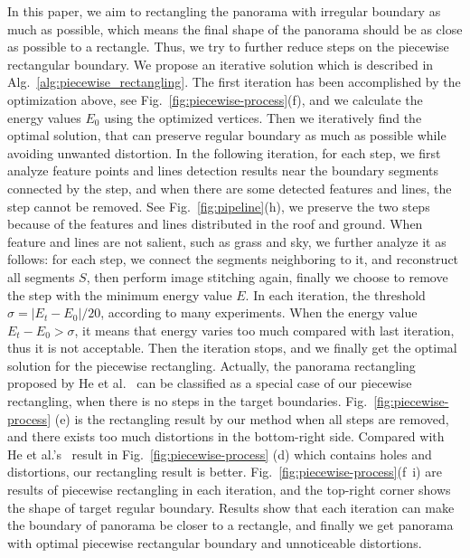 \documentclass[10pt,journal,compsoc]{IEEEtran}
\begin{document}
In this paper, we aim to rectangling the panorama with irregular boundary as much as possible, which means the final shape of the panorama should be as close as possible to a rectangle.
Thus, we try to further reduce steps on the piecewise rectangular boundary.
We propose an iterative solution which is described in Alg.~\ref{alg:piecewise_rectangling}.
The first iteration has been accomplished by the optimization above, see Fig.~\ref{fig:piecewise-process}(f),  and we calculate the energy values $E_0$ using the optimized vertices.
Then we iteratively find the optimal solution, that can preserve regular boundary as much as possible while avoiding unwanted distortion.
In the following iteration, for each step, we first analyze feature points and lines detection results near the boundary segments connected by the step, and when there are some detected features and lines, the step cannot be removed. 
See Fig.~\ref{fig:pipeline}(h), we preserve the two steps because of the features and lines distributed in the roof and ground.
When feature and lines are not salient, such as grass and sky, we further analyze it as follows: for each step, we connect the segments neighboring to it, 
and reconstruct all segments  $S$, then perform image stitching again, finally we choose to remove the step with the minimum energy value $E$.
In each iteration, the threshold $\sigma=|E_t-E_0|/20$, according to many experiments.
When the energy value $E_t-E_0 > \sigma$, it means that energy varies too much compared with last iteration, thus it is not acceptable.
Then the iteration stops, and we finally get the optimal solution for the piecewise rectangling.
Actually, the panorama rectangling proposed by He et al.~\cite{journals/tog/HeC013} can be classified as a special case of our piecewise rectangling, when there is no steps in the target boundaries.
Fig.~\ref{fig:piecewise-process} (e) is the rectangling result by our method when all steps are removed, and there exists too much distortions in the bottom-right side.
Compared with He et al.'s~\cite{journals/tog/HeC013} result in Fig.~\ref{fig:piecewise-process} (d) which contains holes and distortions, our rectangling result is better.
Fig.~\ref{fig:piecewise-process}(f~i) are results of piecewise rectangling in each iteration, and the top-right corner shows the shape of target regular boundary.
Results show that each iteration can make the boundary of panorama be closer to a rectangle, and finally we get panorama with optimal piecewise rectangular boundary and unnoticeable distortions.
\end{document}
